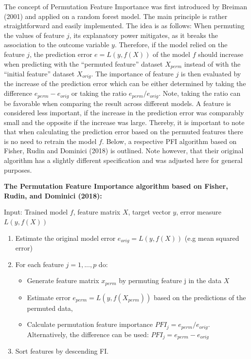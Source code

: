 \documentclass[
]{krantz}
\providecommand{\tightlist}{%
  \setlength{\itemsep}{0pt}\setlength{\parskip}{0pt}}
\begin{document}
The concept of Permutation Feature Importance was first introduced by Breiman (2001) and applied on a random forest model. The main principle is rather straightforward and easily implemented. The idea is as follows: When permuting the values of feature \(j\), its explanatory power mitigates, as it breaks the association to the outcome variable \(y\). Therefore, if the model relied on the feature \(j\), the prediction error \(e = L(y,f(X))\) of the model \(f\) should increase when predicting with the ``permuted feature'' dataset \(X_{perm}\) instead of with the ``initial feature'' dataset \(X_{orig}\). The importance of feature \(j\) is then evaluated by the increase of the prediction error which can be either determined by taking the difference \(e_{perm} - e_{orig}\) or taking the ratio \(e_{perm}/e_{orig}\). Note, taking the ratio can be favorable when comparing the result across different models. A feature is considered less important, if the increase in the prediction error was comparably small and the opposite if the increase was large. Thereby, it is important to note that when calculating the prediction error based on the permuted features there is no need to retrain the model \(f\). Below, a respective PFI algorithm based on Fisher, Rudin and Dominici (2018) is outlined. Note however, that their original algorithm has a slightly different specification and was adjusted here for general purposes.

\textbf{The Permutation Feature Importance algorithm based on Fisher, Rudin, and Dominici (2018):}

Input: Trained model \(f\), feature matrix \(X\), target vector \(y\), error measure \(L(y,f(X))\)

\begin{enumerate}
\def\labelenumi{\arabic{enumi}.}
\tightlist
\item
  Estimate the original model error \(e_{orig} = L(y,f(X))\) (e.g mean squared error)
\item
  For each feature \(j = 1,...,p\) do:

  \begin{itemize}
  \tightlist
  \item
    Generate feature matrix \(x_{perm}\) by permuting feature j in the data \(X\)
  \item
    Estimate error \(e_{perm} = L(y,f(X_{perm}))\) based on the predictions of the permuted data,
  \item
    Calculate permutation feature importance \(PFI_{j} = e_{perm}/e_{orig}\). Alternatively, the difference can be used: \(PFI_{j} = e_{perm} - e_{orig}\)
  \end{itemize}
\item
  Sort features by descending FI.
\end{enumerate}
\end{document}
